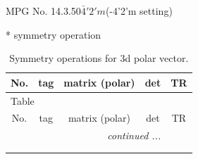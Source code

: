\documentclass[fleqn,8pt]{jsarticle}
\begin{document}
\setcounter{MaxMatrixCols}{32}

\renewcommand{\tablename}{Table~}
\renewcommand{\figurename}{Figure~}
\begin{center}
\LARGE
MPG No. 14.3.50\quad$\bar{4}'2'm$\quad(-4'2'm setting)
\end{center}
* symmetry operation
\renewcommand{\arraystretch}{1.3}
\begin{longtable}{ccccc}
\caption{Symmetry operations for 3d polar vector.}
 \\
 \hline \hline
No. & tag & matrix (polar) & det & TR \\ \hline \endfirsthead

\multicolumn{4}{l}{\tablename\ \thetable{}} \\
 \hline \hline
No. & tag & matrix (polar) & det & TR \\ \hline \endhead

 \hline \hline
\multicolumn{4}{r}{\footnotesize\it continued ...} \\ \endfoot

 \hline \hline
\multicolumn{4}{r}{} \\ \endlastfoot


\end{longtable}
\end{document}
